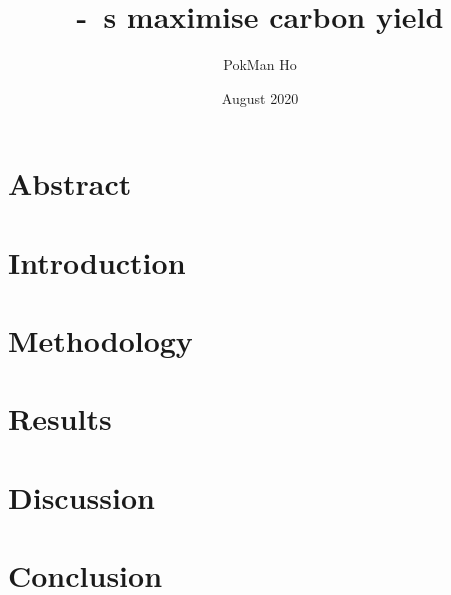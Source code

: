 \documentclass[a4paper,11pt]{article}
\title{\Phy-\bac\ \pbs s maximise carbon yield\vspace{3.5cm}}
\author{PokMan Ho}
\date{August 2020}
\begin{document}
\maketitle



\section{Abstract}


\section{Introduction}


\section{Methodology}


\section{Results}



\section{Discussion}



\section{Conclusion}




\nocite{*}\printbibliography
\clearpage

\end{document}
